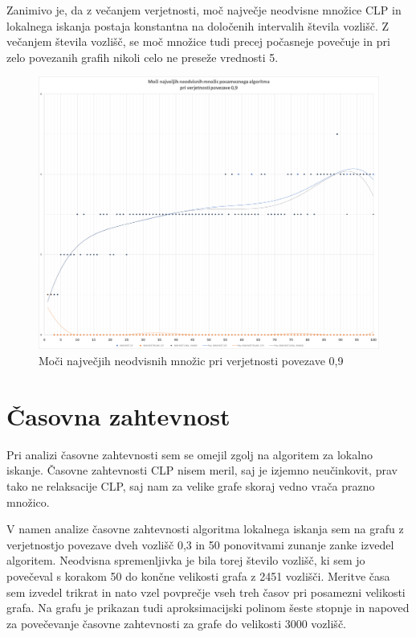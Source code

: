 \documentclass[a4paper, 12 pt]{article}
\theoremstyle{definition}
\theoremstyle{plain}
\theoremstyle{remark}
\begin{document}
Zanimivo je, da z večanjem verjetnosti, moč največje neodvisne množice CLP in lokalnega iskanja postaja konstantna na določenih intervalih števila vozlišč. Z večanjem števila vozlišč, se moč množice tudi precej počasneje povečuje in pri zelo povezanih grafih nikoli celo ne preseže vrednosti 5.


\begin{figure}[H]
\centering
  \includegraphics[scale=0.28]{0,9 moci.png}
  \caption{Moči največjih neodvisnih množic pri verjetnosti povezave 0,9}
  \label{fig:moc0,9} 
\end{figure}

\newpage
\section{Časovna zahtevnost} %
Pri analizi časovne zahtevnosti sem se omejil zgolj na algoritem za lokalno iskanje. Časovne zahtevnosti CLP nisem meril, saj je izjemno neučinkovit,  prav tako ne relaksacije CLP, saj nam za velike grafe skoraj vedno vrača prazno množico.

V namen analize časovne zahtevnosti algoritma lokalnega iskanja sem na grafu z verjetnostjo povezave dveh vozlišč 0,3 in 50 ponovitvami zunanje zanke izvedel algoritem. Neodvisna spremenljivka je bila torej število vozlišč, ki sem jo povečeval s korakom 50 do končne velikosti grafa z 2451 vozlišči. Meritve časa sem izvedel trikrat in nato vzel povprečje vseh treh časov pri posamezni velikosti grafa. Na grafu je prikazan tudi aproksimacijski polinom šeste stopnje in napoved za povečevanje časovne zahtevnosti za grafe do velikosti 3000 vozlišč.
\end{document}
